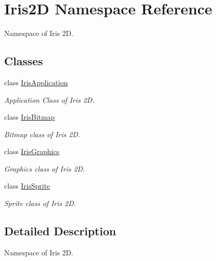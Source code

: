 \hypertarget{namespace_iris2_d}{}\section{Iris2D Namespace Reference}
\label{namespace_iris2_d}


Namespace of Iris 2D.  


\subsection*{Classes}
\begin{DoxyCompactItemize}
\item 
class \hyperlink{class_iris2_d_1_1_iris_application}{Iris\+Application}
\begin{DoxyCompactList}\small\item\em Application Class of Iris 2D. \end{DoxyCompactList}\item 
class \hyperlink{class_iris2_d_1_1_iris_bitmap}{Iris\+Bitmap}
\begin{DoxyCompactList}\small\item\em Bitmap class of Iris 2D. \end{DoxyCompactList}\item 
class \hyperlink{class_iris2_d_1_1_iris_graphics}{Iris\+Graphics}
\begin{DoxyCompactList}\small\item\em Graphics class of Iris 2D. \end{DoxyCompactList}\item 
class \hyperlink{class_iris2_d_1_1_iris_sprite}{Iris\+Sprite}
\begin{DoxyCompactList}\small\item\em Sprite class of Iris 2D. \end{DoxyCompactList}\end{DoxyCompactItemize}


\subsection{Detailed Description}
Namespace of Iris 2D. 